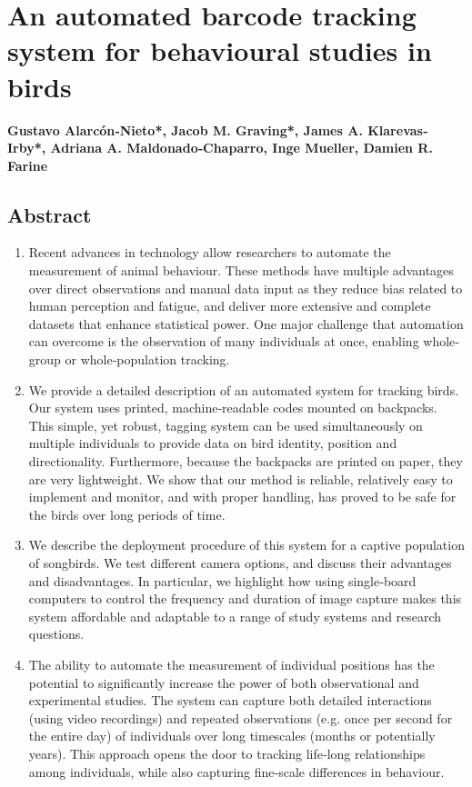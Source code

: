 \documentclass[11pt,a4paper,oneside]{book}
\begin{document}
\newpage 
	\chapter[An automated barcode tracking system]{An automated barcode tracking system for behavioural studies in birds}
	\vspace{5mm}
	 \textbf{Gustavo Alarcón‐Nieto*, Jacob M. Graving*, James A. Klarevas‐Irby*, Adriana A. Maldonado‐Chaparro, Inge Mueller, Damien R. Farine} \\
    \vspace{1mm}
    
    \normalsize
	\section{Abstract}
	\begin{enumerate}
	    \item 	Recent advances in technology allow researchers to automate the measurement of animal behaviour. These methods have multiple advantages over direct observations and manual data input as they reduce bias related to human perception and fatigue, and deliver more extensive and complete datasets that enhance statistical power. One major challenge that automation can overcome is the observation of many individuals at once, enabling whole‐group or whole‐population tracking.
        \item We provide a detailed description of an automated system for tracking birds. Our system uses printed, machine‐readable codes mounted on backpacks. This simple, yet robust, tagging system can be used simultaneously on multiple individuals to provide data on bird identity, position and directionality. Furthermore, because the backpacks are printed on paper, they are very lightweight. We show that our method is reliable, relatively easy to implement and monitor, and with proper handling, has proved to be safe for the birds over long periods of time.
        \item     We describe the deployment procedure of this system for a captive population of songbirds. We test different camera options, and discuss their advantages and disadvantages. In particular, we highlight how using single‐board computers to control the frequency and duration of image capture makes this system affordable and adaptable to a range of study systems and research questions.
        \item     The ability to automate the measurement of individual positions has the potential to significantly increase the power of both observational and experimental studies. The system can capture both detailed interactions (using video recordings) and repeated observations (e.g. once per second for the entire day) of individuals over long timescales (months or potentially years). This approach opens the door to tracking life‐long relationships among individuals, while also capturing fine‐scale differences in behaviour.
	\end{enumerate}
\end{document}

